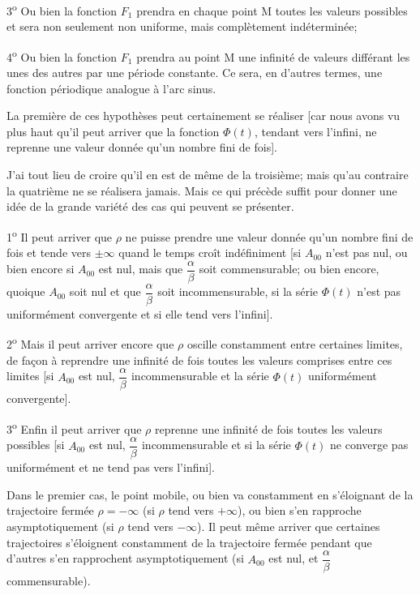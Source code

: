 \documentclass[11pt]{article}
\begin{document}
3\textsuperscript{o} Ou bien la fonction $F_1$ prendra en chaque point M toutes les valeurs possibles et sera non seulement non uniforme, mais complètement indéterminée;

4\textsuperscript{o} Ou bien la fonction $F_1$ prendra au point M une infinité de valeurs différant les unes des autres par une période constante. Ce sera, en d’autres termes, une fonction périodique analogue à l’arc sinus.

La première de ces hypothèses peut certainement se réaliser [car nous avons vu plus haut qu’il peut arriver que la fonction $\Phi(t)$, tendant vers l’infini, ne reprenne une valeur donnée qu’un nombre fini de fois].

J’ai tout lieu de croire qu’il en est de même de la troisième; mais qu’au contraire la quatrième ne se réalisera jamais. Mais ce qui précède suffit pour donner une idée de la grande variété des cas qui peuvent se présenter.

1\textsuperscript{o} Il peut arriver que $\rho$ ne puisse prendre une valeur donnée qu’un nombre fini de fois et tende vers $\pm\infty$ quand le temps croît indéfiniment [si $A_{00}$ n’est pas nul, ou bien encore si $A_{00}$ est nul, mais que $\dfrac{\alpha}{\beta}$ soit commensurable; ou bien encore, quoique $A_{00}$ soit nul et que $\dfrac{\alpha}{\beta}$ soit incommensurable, si la série $\Phi(t)$ n’est pas uniformément convergente et si elle tend vers l’infini].

2\textsuperscript{o} Mais il peut arriver encore que $\rho$ oscille constamment entre certaines limites, de façon à reprendre une infinité de fois toutes les valeurs comprises entre ces limites [si $A_{00}$ est nul, $\dfrac{\alpha}{\beta}$ incommensurable et la série $\Phi(t)$ uniformément convergente].

3\textsuperscript{o} Enfin il peut arriver que $\rho$ reprenne une infinité de fois toutes les valeurs possibles [si $A_{00}$ est nul, $\dfrac{\alpha}{\beta}$ incommensurable et si la série $\Phi(t)$ ne converge pas uniformément et ne tend pas vers l’infini].

Dans le premier cas, le point mobile, ou bien va constamment en s’éloignant de la trajectoire fermée $\rho=-\infty$ (si $\rho$ tend vers $+\infty$), ou bien s’en rapproche asymptotiquement (si $\rho$ tend vers $-\infty$). Il peut même arriver que certaines trajectoires s’éloignent constamment de la trajectoire fermée pendant que d’autres s’en rapprochent asymptotiquement (si $A_{00}$ est nul, et $\dfrac{\alpha}{\beta}$ commensurable).
\end{document}
